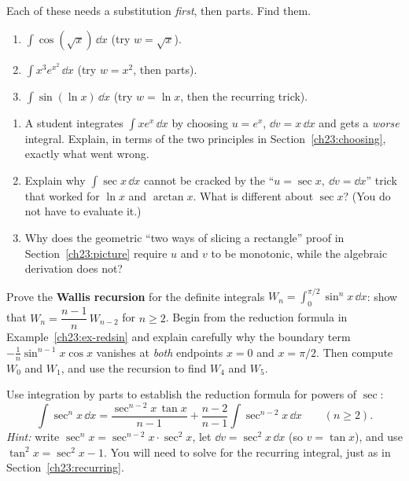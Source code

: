 \begin{exercise}
\label{ch23:exr-combine}
Each of these needs a substitution \emph{first}, then parts. Find them.
\begin{enumerate}[label=(\alph*)]
\item $\displaystyle\int \cos(\sqrt{x})\,\dd x$ \quad (try $w=\sqrt{x}$).
\item $\displaystyle\int x^3 e^{x^2}\,\dd x$ \quad (try $w=x^2$, then parts).
\item $\displaystyle\int \sin(\ln x)\,\dd x$ \quad (try $w=\ln x$, then the
recurring trick).
\end{enumerate}
\end{exercise}

\begin{exercise}[Conceptual]
\label{ch23:exr-concept}
\begin{enumerate}[label=(\alph*)]
\item A student integrates $\int x e^x\,\dd x$ by choosing $u=e^x$,
$\dd v = x\,\dd x$ and gets a \emph{worse} integral. Explain, in terms of the two
principles in Section~\ref{ch23:choosing}, exactly what went wrong.
\item Explain why $\int \sec x\,\dd x$ cannot be cracked by the
``$u=\sec x,\ \dd v=\dd x$'' trick that worked for $\ln x$ and $\arctan x$. What is
different about $\sec x$? (You do not have to evaluate it.)
\item Why does the geometric ``two ways of slicing a rectangle'' proof in
Section~\ref{ch23:picture} require $u$ and $v$ to be monotonic, while the
algebraic derivation does not?
\end{enumerate}
\end{exercise}

\begin{exercise}[A proof]
\label{ch23:exr-proof}
Prove the \textbf{Wallis recursion} for the definite integrals
$\displaystyle W_n = \int_0^{\pi/2}\sin^n x\,\dd x$: show that
$W_n = \dfrac{n-1}{n}\,W_{n-2}$ for $n\ge 2$. Begin from the reduction formula in
Example~\ref{ch23:ex-redsin} and explain carefully why the boundary term
$-\frac1n\sin^{n-1}x\cos x$ vanishes at \emph{both} endpoints $x=0$ and
$x=\pi/2$. Then compute $W_0$ and $W_1$, and use the recursion to find
$W_4$ and $W_5$.
\end{exercise}

\begin{exercise}
\label{ch23:exr-further}
Use integration by parts to establish the reduction formula for powers of
$\sec$:
\[
\int \sec^n x\,\dd x = \frac{\sec^{n-2}x\,\tan x}{n-1}
+ \frac{n-2}{n-1}\int \sec^{n-2}x\,\dd x \qquad (n\ge 2).
\]
\textit{Hint:} write $\sec^n x = \sec^{n-2}x\cdot\sec^2 x$, let
$\dd v = \sec^2 x\,\dd x$ (so $v=\tan x$), and use $\tan^2 x = \sec^2 x - 1$. You
will need to solve for the recurring integral, just as in
Section~\ref{ch23:recurring}.
\end{exercise}
